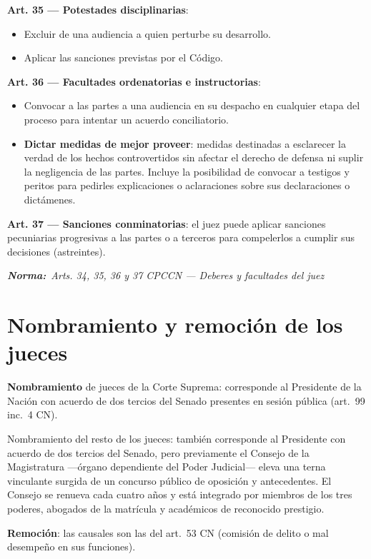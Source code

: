 \documentclass[12pt,oneside]{book}
\newcommand{\normaref}[1]{%
    \par\noindent\textbf{\textit{Norma:}}~\textit{#1}\par\vspace{0.2em}
}
\begin{document}
\textbf{Art. 35 --- Potestades disciplinarias}:
\begin{itemize}
    \item Excluir de una audiencia a quien perturbe su desarrollo.
    \item Aplicar las sanciones previstas por el Código.
\end{itemize}

\textbf{Art. 36 --- Facultades ordenatorias e instructorias}:
\begin{itemize}
    \item Convocar a las partes a una audiencia en su despacho en cualquier etapa del proceso para intentar un acuerdo conciliatorio.
    \item \textbf{Dictar medidas de mejor proveer}: medidas destinadas a esclarecer la verdad de los hechos controvertidos sin afectar el derecho de defensa ni suplir la negligencia de las partes. Incluye la posibilidad de convocar a testigos y peritos para pedirles explicaciones o aclaraciones sobre sus declaraciones o dictámenes.
\end{itemize}

\textbf{Art. 37 --- Sanciones conminatorias}: el juez puede aplicar sanciones pecuniarias progresivas a las partes o a terceros para compelerlos a cumplir sus decisiones (astreintes).

\normaref{Arts. 34, 35, 36 y 37 CPCCN --- Deberes y facultades del juez}

\section{Nombramiento y remoción de los jueces}

\textbf{Nombramiento} de jueces de la Corte Suprema: corresponde al Presidente de la Nación con acuerdo de dos tercios del Senado presentes en sesión pública (art.\ 99 inc.\ 4 CN).

Nombramiento del resto de los jueces: también corresponde al Presidente con acuerdo de dos tercios del Senado, pero previamente el Consejo de la Magistratura —órgano dependiente del Poder Judicial— eleva una terna vinculante surgida de un concurso público de oposición y antecedentes. El Consejo se renueva cada cuatro años y está integrado por miembros de los tres poderes, abogados de la matrícula y académicos de reconocido prestigio.

\textbf{Remoción}: las causales son las del art.\ 53 CN (comisión de delito o mal desempeño en sus funciones).
\end{document}
